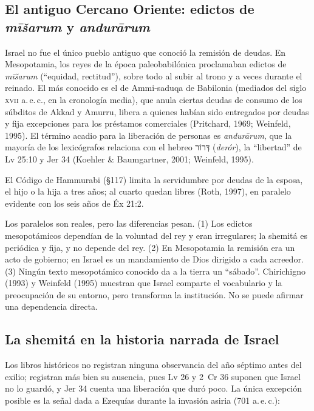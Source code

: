 \documentclass[11pt,letterpaper]{article}
\newcommand{\heb}[1]{\mbox{\foreignlanguage{hebrew}{#1}}}
\begin{document}
\subsection{El antiguo Cercano Oriente: edictos de \emph{mīšarum} y \emph{andurārum}}
Israel no fue el único pueblo antiguo que conoció la remisión de deudas. En Mesopotamia, los reyes de la época paleobabilónica proclamaban edictos de \emph{mīšarum} (``equidad, rectitud''), sobre todo al subir al trono y a veces durante el reinado. El más conocido es el de Ammi-saduqa de Babilonia (mediados del siglo \textsc{xvii} a.\,e.\,c., en la cronología media), que anula ciertas deudas de consumo de los súbditos de Akkad y Amurru, libera a quienes habían sido entregados por deudas y fija excepciones para los préstamos comerciales (Pritchard, 1969; Weinfeld, 1995). El término acadio para la liberación de personas es \emph{andurārum}, que la mayoría de los lexicógrafos relaciona con el hebreo \heb{דְּרוֹר} (\emph{derór}), la ``libertad'' de Lv 25:10 y Jer 34 (Koehler \& Baumgartner, 2001; Weinfeld, 1995).

El Código de Hammurabi (§117) limita la servidumbre por deudas de la esposa, el hijo o la hija a tres años; al cuarto quedan libres (Roth, 1997), en paralelo evidente con los seis años de Éx 21:2.

\begin{nota}[Precisión]
Los paralelos son reales, pero las diferencias pesan. (1) Los edictos mesopotámicos dependían de la voluntad del rey y eran irregulares; la shemitá es periódica y fija, y no depende del rey. (2) En Mesopotamia la remisión era un acto de gobierno; en Israel es un mandamiento de Dios dirigido a cada acreedor. (3) Ningún texto mesopotámico conocido da a la tierra un ``sábado''. Chirichigno (1993) y Weinfeld (1995) muestran que Israel comparte el vocabulario y la preocupación de su entorno, pero transforma la institución. No se puede afirmar una dependencia directa.
\end{nota}

\subsection{La shemitá en la historia narrada de Israel}
Los libros históricos no registran ninguna observancia del año séptimo antes del exilio; registran más bien su ausencia, pues Lv 26 y 2~Cr 36 suponen que Israel no lo guardó, y Jer 34 cuenta una liberación que duró poco. La única excepción posible es la señal dada a Ezequías durante la invasión asiria (701 a.\,e.\,c.):
\end{document}
